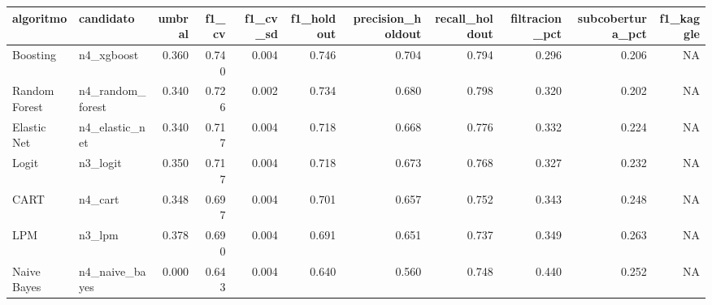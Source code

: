 
\begin{tabular}{llrrrrrrrrr}
\toprule
algoritmo & candidato & umbral & f1\_cv & f1\_cv\_sd & f1\_holdout & precision\_holdout & recall\_holdout & filtracion\_pct & subcobertura\_pct & f1\_kaggle\\
\midrule
Boosting & n4\_xgboost & 0.360 & 0.740 & 0.004 & 0.746 & 0.704 & 0.794 & 0.296 & 0.206 & NA\\
Random Forest & n4\_random\_forest & 0.340 & 0.726 & 0.002 & 0.734 & 0.680 & 0.798 & 0.320 & 0.202 & NA\\
Elastic Net & n4\_elastic\_net & 0.340 & 0.717 & 0.004 & 0.718 & 0.668 & 0.776 & 0.332 & 0.224 & NA\\
Logit & n3\_logit & 0.350 & 0.717 & 0.004 & 0.718 & 0.673 & 0.768 & 0.327 & 0.232 & NA\\
CART & n4\_cart & 0.348 & 0.697 & 0.004 & 0.701 & 0.657 & 0.752 & 0.343 & 0.248 & NA\\
\addlinespace
LPM & n3\_lpm & 0.378 & 0.690 & 0.004 & 0.691 & 0.651 & 0.737 & 0.349 & 0.263 & NA\\
Naive Bayes & n4\_naive\_bayes & 0.000 & 0.643 & 0.004 & 0.640 & 0.560 & 0.748 & 0.440 & 0.252 & NA\\
\bottomrule
\end{tabular}
